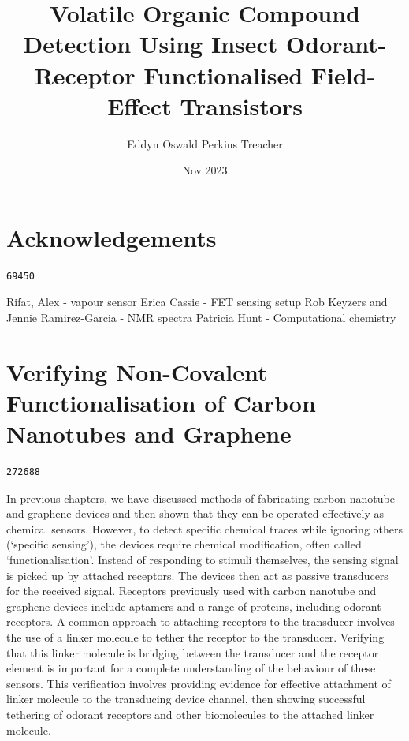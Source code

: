 \documentclass[
  a4paper,
]{scrbook}
\title{Volatile Organic Compound Detection Using Insect Odorant-Receptor
Functionalised Field-Effect Transistors}
\author{Eddyn Oswald Perkins Treacher}
\date{Nov 2023}
\renewcommand*\contentsname{Table of contents}
\newcommand\contentsname{Table of contents}
\begin{document}
\frontmatter
\maketitle
\ifdefined\Shaded\renewenvironment{Shaded}{\begin{tcolorbox}[sharp corners, frame hidden, enhanced, interior hidden, boxrule=0pt, breakable, borderline west={3pt}{0pt}{shadecolor}]}{\end{tcolorbox}}\fi

\renewcommand*\contentsname{Table of contents}
{
\setcounter{tocdepth}{2}
\tableofcontents
}
\mainmatter
{}

\hypertarget{acknowledgements}{%
\chapter*{Acknowledgements}\label{acknowledgements}}


\begin{verbatim}
69450
\end{verbatim}

Rifat, Alex - vapour sensor Erica Cassie - FET sensing setup Rob Keyzers
and Jennie Ramirez-Garcia - NMR spectra Patricia Hunt - Computational
chemistry


\hypertarget{verifying-non-covalent-functionalisation-of-carbon-nanotubes-and-graphene}{%
\chapter{Verifying Non-Covalent Functionalisation of Carbon Nanotubes
and
Graphene}\label{verifying-non-covalent-functionalisation-of-carbon-nanotubes-and-graphene}}

\begin{verbatim}
272688
\end{verbatim}

In previous chapters, we have discussed methods of fabricating carbon
nanotube and graphene devices and then shown that they can be operated
effectively as chemical sensors. However, to detect specific chemical
traces while ignoring others (`specific sensing'), the devices require
chemical modification, often called `functionalisation'. Instead of
responding to stimuli themselves, the sensing signal is picked up by
attached receptors. The devices then act as passive transducers for the
received signal. Receptors previously used with carbon nanotube and
graphene devices include aptamers and a range of proteins, including
odorant receptors. A common approach to attaching receptors to the
transducer involves the use of a linker molecule to tether the receptor
to the transducer. Verifying that this linker molecule is bridging
between the transducer and the receptor element is important for a
complete understanding of the behaviour of these sensors. This
verification involves providing evidence for effective attachment of
linker molecule to the transducing device channel, then showing
successful tethering of odorant receptors and other biomolecules to the
attached linker molecule.
\end{document}
